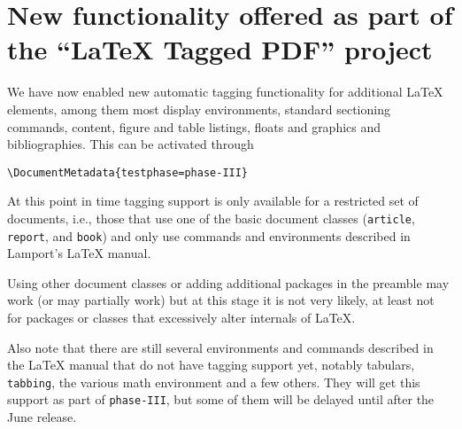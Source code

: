 \documentclass{ltnews}
\providecommand\tubcommand[1]{}
\begin{document}
\tubcommand{\addtolength\textheight{4.1pc}}   %

\maketitle
{  \spaceskip=3.33pt 
\tableofcontents}

\setlength{}

\tubcommand{\fontsize{9.6}{12}\selectfont}


\medskip




\section{New functionality offered as part of the
  \enquote{\LaTeX{} Tagged PDF} project}

We have now enabled new automatic tagging functionality for additional
\LaTeX{} elements, among them most display environments, standard
sectioning commands, content, figure and table listings, floats and graphics and
bibliographies. This can
be activated through
\begin{verbatim}
\DocumentMetadata{testphase=phase-III}
\end{verbatim}
At this point in time tagging support is only available for a
restricted set of documents, i.e., those that use one of the basic
document classes (\texttt{article}, \texttt{report}, and
\texttt{book}) and only use commands and environments described in
Lamport's \LaTeX{} manual.

Using other document classes or adding additional packages in the
preamble may work (or may partially work) but at this stage it is not
very likely, at least not for packages or classes that excessively
alter internals of \LaTeX{}.

Also note that there are still several environments and commands
described in the \LaTeX{} manual that do not have tagging support yet,
notably tabulars, \texttt{tabbing}, the various math environment and a
few others.  They will get this support as part of \texttt{phase-III},
but some of them will be delayed until after the June release.
\end{document}
